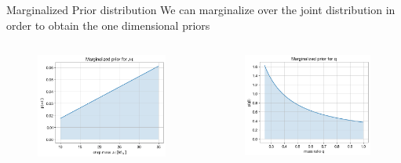\documentclass[
10pt,
aspectratio=169,
]{beamer}
\begin{document}
\begin{frame}{Marginalized Prior distribution}
We can marginalize over the joint distribution in order to obtain the one dimensional priors
\begin{columns}[onlytextwidth]
    \begin{figure}
    \centering
    \includegraphics[width=\textwidth]{marginalized_m.png}
\end{figure}
    \begin{figure}
    \centering
    \includegraphics[width=\textwidth]{marginalized_q.png}
\end{figure}
\end{columns}
\end{frame}
\end{document}
